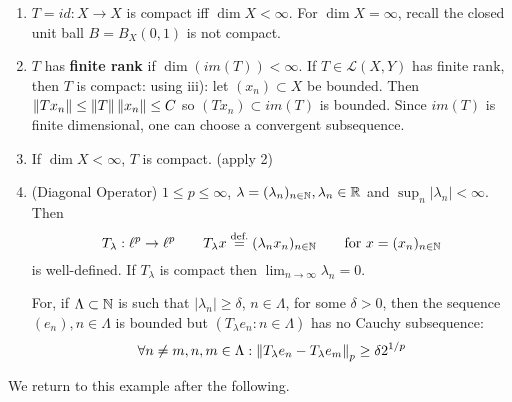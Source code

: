 \documentclass{article}
\begin{document}
\begin{example}
\label{examples of compact operators}
\begin{enumerate}[1)]
    \item $T=id:X\to X$ is compact iff $\dim X <\infty$. For $\dim X=\infty$, recall the closed unit ball $B=B_X(0,1)$ is not compact. 
    
    \item $T$ has \textbf{finite rank} if $\dim (im(T))<\infty$. If $T\in \mathcal{L}(X,Y)$ has finite rank, then $T$ is compact: using  iii): let $(x_n)\subset X$ be bounded. Then $\left\|{Tx_n}\right\| \leq \left\|{T}\right\|\left\|{x_n}\right\| \leq C$ so $(Tx_n)\subset im(T)$ is bounded. Since $im(T)$ is finite dimensional, one can choose a convergent subsequence.  

    \item If $\dim X<\infty$, $T$ is compact. (apply 2)

    \item (Diagonal Operator) $1\leq p \leq \infty$, $\lambda = (\lambda_n)_{n \in \mathbb{N}}, \lambda_n \in \mathbb{R}$ and $\sup_n |\lambda_n|<\infty$. Then  
    $$
    T_\lambda: \ell^p \to \ell^p \qquad T_\lambda x \stackrel{\text{def.}}{=} (\lambda_n x_n)_{n\in \mathbb{N}} \qquad \text{for\ } x=(x_n)_{n\in \mathbb{N}}
    $$
    is well-defined. If $T_\lambda$ is compact then $\lim_{n\to \infty} \lambda_n = 0$.  

    For, if $\Lambda \subset \mathbb{N}$ is such that $|\lambda_n|\geq \delta$, $n\in \Lambda$, for some $\delta>0$, then the sequence $(e_n), n\in \Lambda$ is bounded but $(T_{\lambda}e_n: n\in \Lambda)$ has no Cauchy subsequence:  
    $$
    \forall n\neq m, n,m\in \Lambda: \left\|{T_\lambda e_n - T_\lambda e_m}\right\|_p \geq \delta 2^{1/p}
    $$  
\end{enumerate}
\end{example}

We return to this example after the following.  
\end{document}
